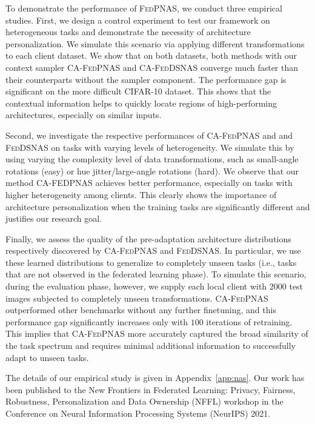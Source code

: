 To demonstrate the performance of \textsc{FedPNAS}, we conduct three empirical studies. First, we design a control experiment to test our framework on heterogeneous tasks and demonstrate the necessity of architecture personalization. We simulate this scenario via applying different transformations to each client dataset. We show that on both datasets, both methods with our context sampler \textsc{CA-FedPNAS} and \textsc{CA-FedDSNAS} converge much faster than
their counterparts without the sampler component. The performance gap is significant on the more difficult \textsc{CIFAR-10} dataset. This shows that the contextual information helps to quickly locate regions of high-performing architectures, especially on
similar inputs.

Second, we investigate the respective performances of \textsc{CA-FedPNAS} and
and \textsc{FedDSNAS} on tasks with varying levels of heterogeneity. We simulate this by using varying the complexity level of data transformations, such as small-angle rotations (easy) or hue jitter/large-angle rotations (hard). We observe that our method CA-FEDPNAS achieves better performance, especially on tasks with higher heterogeneity among clients. This clearly shows the importance of architecture personalization when the training tasks are significantly
different and justifies our research goal.

Finally, we assess the quality of the pre-adaptation architecture distributions
respectively discovered by \textsc{CA-FedPNAS} and \textsc{FedDSNAS}. In particular, we use these learned
distributions to generalize to
completely unseen tasks (i.e., tasks that are not observed in the federated learning phase). To simulate
this scenario, during the evaluation
phase, however, we supply each local client with 2000 test images subjected to completely unseen transformations. \textsc{CA-FedPNAS} outperformed other benchmarks without any further finetuning, and this performance gap significantly increases only with $100$ iterations of retraining. This implies that \textsc{CA-FedPNAS} more accurately captured the broad similarity of the task spectrum and
requires minimal additional information to successfully adapt to unseen tasks.

The details of our empirical study is given in Appendix~\ref{app:nas}. Our work has been published to the New Frontiers in Federated Learning:
Privacy, Fairness, Robustness, Personalization and Data Ownership (NFFL) workshop in the Conference on Neural Information Processing Systems (NeurIPS) 2021.